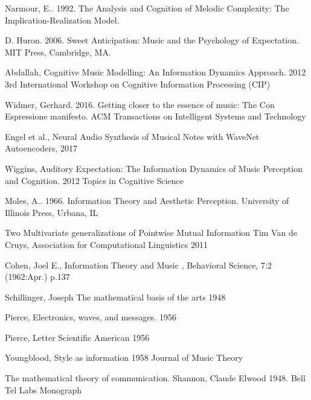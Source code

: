 \documentclass[final,authoryear,11pt,times]{elsarticle}
\begin{document}
Narmour, E.. 1992. The Analysis and Cognition of Melodic Complexity: The Implication-Realization Model.

D. Huron. 2006. Sweet Anticipation: Music and the Psychology of Expectation. MIT Press, Cambridge, MA.

Abdallah, Cognitive Music Modelling: An Information Dynamics Approach. 2012 3rd International Workshop on Cognitive Information Processing (CIP)

Widmer, Gerhard. 2016. Getting closer to the essence of music: The Con Espressione manifesto. ACM Transactions on Intelligent Systems and Technology

Engel et al., Neural Audio Synthesis of Musical Notes with WaveNet Autoencoders, 2017

Wiggins, Auditory Expectation: The Information Dynamics of Music Perception and Cognition. 2012 Topics in Cognitive Science

Moles, A.. 1966. Information Theory and Aesthetic Perception. University of Illinois Press, Urbana, IL

Two Multivariate generalizations of Pointwise Mutual Information Tim Van de Cruys, Association for Computational Linguistics 2011

Cohen, Joel E., Information Theory and Music , Behavioral Science, 7:2 (1962:Apr.) p.137

Schillinger, Joseph The mathematical basis of the arts 1948

Pierce, Electronics, waves, and messages. 1956

Pierce, Letter Scientific American 1956

Youngblood, Style as information 1958 Journal of Music Theory

The mathematical theory of communication. Shannon, Claude Elwood 1948. Bell Tel Labs Monograph



\end{document}
